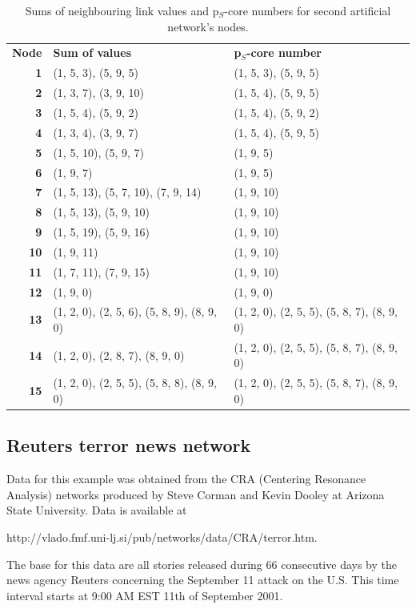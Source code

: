 \documentclass[a4paper,twoside,10pt]{article}
\begin{document}
\begin{table}
\centering
\caption{Sums of neighbouring link values and p$_S$-core numbers for second artificial network's nodes.}
\label{artificial2tab}
\begin{tabular}{r|l|l}
\textbf{Node} & \textbf{Sum of values} & \textbf{p$_S$-core number} \\
\textbf{1}	&	(1, 5, 3), (5, 9, 5)	&	(1, 5, 3), (5, 9, 5)	\\
\textbf{2}	&	(1, 3, 7), (3, 9, 10)	&	(1, 5, 4), (5, 9, 5)	\\
\textbf{3}	&	(1, 5, 4), (5, 9, 2)	&	(1, 5, 4), (5, 9, 2)	\\
\textbf{4}	&	(1, 3, 4), (3, 9, 7)	&	(1, 5, 4), (5, 9, 5)	\\
\textbf{5}	&	(1, 5, 10), (5, 9, 7)	&	(1, 9, 5) \\
\textbf{6}	&	(1, 9, 7)	&	(1, 9, 5)	\\
\textbf{7}	&	(1, 5, 13), (5, 7, 10), (7, 9, 14)	&	(1, 9, 10)	\\
\textbf{8}	&	(1, 5, 13), (5, 9, 10)	&	(1, 9, 10)	\\
\textbf{9}	&	(1, 5, 19), (5, 9, 16)	&	(1, 9, 10)	\\
\textbf{10}	&	(1, 9, 11)	&	(1, 9, 10)	\\
\textbf{11}	&	(1, 7, 11), (7, 9, 15)	&	(1, 9, 10)	\\
\textbf{12}	&	(1, 9, 0)	&	(1, 9, 0)	\\
\textbf{13}	&	(1, 2, 0), (2, 5, 6), (5, 8, 9), (8, 9, 0)	&	(1, 2, 0), (2, 5, 5), (5, 8, 7), (8, 9, 0)	\\
\textbf{14}	&	(1, 2, 0), (2, 8, 7), (8, 9, 0)	&	(1, 2, 0), (2, 5, 5), (5, 8, 7), (8, 9, 0)	\\
\textbf{15}	&	(1, 2, 0), (2, 5, 5), (5, 8, 8), (8, 9, 0)	&	(1, 2, 0), (2, 5, 5), (5, 8, 7), (8, 9, 0)
\end{tabular}
\end{table}


\subsection{Reuters terror news network}

Data for this example was obtained from the CRA (Centering Resonance Analysis) networks produced by Steve Corman and Kevin Dooley at Arizona State University. Data is available at
 
http://vlado.fmf.uni-lj.si/pub/networks/data/CRA/terror.htm.
 
The base for this data are all stories released during $66$ consecutive days by the news agency Reuters concerning the September 11 attack on the U.S. This time interval starts at 9:00 AM EST 11th of September 2001. 
\end{document}
